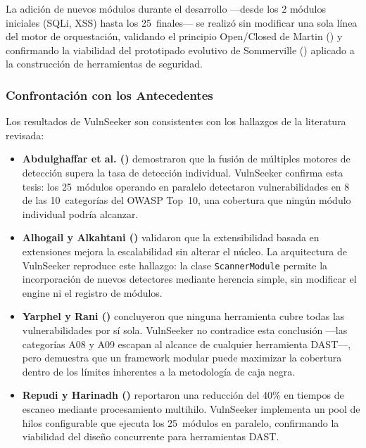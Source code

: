 \documentclass[12pt, a4paper]{article}
\begin{document}
La adición de nuevos módulos durante el desarrollo ---desde los 2
módulos iniciales (SQLi, XSS) hasta los 25~finales--- se realizó sin
modificar una sola línea del motor de orquestación, validando el
principio Open/Closed de Martin (\citeyear*{martin2003}) y confirmando
la viabilidad del prototipado evolutivo de Sommerville
(\citeyear*{sommerville2011}) aplicado a la construcción de herramientas
de seguridad.

\subsubsection{Confrontación con los Antecedentes}

Los resultados de VulnSeeker son consistentes con los hallazgos de la
literatura revisada:

\begin{itemize}
    \item \textbf{Abdulghaffar et al. (\citeyear*{abdulghaffar2023})}
    demostraron que la fusión de múltiples motores de detección supera
    la tasa de detección individual. VulnSeeker confirma esta tesis:
    los 25~módulos operando en paralelo detectaron vulnerabilidades
    en 8 de las 10~categorías del OWASP Top~10, una cobertura que
    ningún módulo individual podría alcanzar.

    \item \textbf{Alhogail y Alkahtani (\citeyear*{alhogail2024})}
    validaron que la extensibilidad basada en extensiones mejora la
    escalabilidad sin alterar el núcleo. La arquitectura de VulnSeeker
    reproduce este hallazgo: la clase \texttt{ScannerModule} permite
    la incorporación de nuevos detectores mediante herencia simple,
    sin modificar el engine ni el registro de módulos.

    \item \textbf{Yarphel y Rani (\citeyear*{yarphel2025})} concluyeron
    que ninguna herramienta cubre todas las vulnerabilidades por sí sola.
    VulnSeeker no contradice esta conclusión ---las categorías A08 y A09
    escapan al alcance de cualquier herramienta DAST---, pero demuestra
    que un framework modular puede maximizar la cobertura dentro de los
    límites inherentes a la metodología de caja negra.

    \item \textbf{Repudi y Harinadh (\citeyear*{repudi2024})} reportaron
    una reducción del 40\% en tiempos de escaneo mediante procesamiento
    multihilo. VulnSeeker implementa un pool de hilos configurable que
    ejecuta los 25~módulos en paralelo, confirmando la viabilidad del
    diseño concurrente para herramientas DAST.
\end{itemize}
\end{document}
